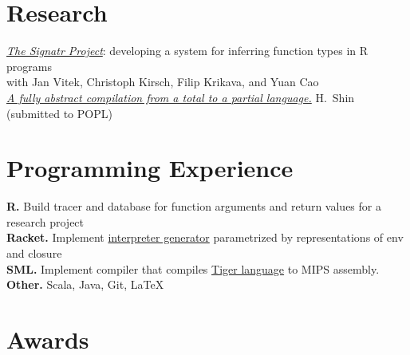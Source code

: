 \documentclass[margin,line]{resume}
\begin{document}
\begin{resume}
    \renewcommand\mymedskip{3pt}
    \section{\mysidestyle Research}
    \textit{\href{https://github.com/PRL-PRG/signatr}{The Signatr Project}}:
    developing a system for inferring function types in R programs\\
          {\small with Jan Vitek, Christoph Kirsch, Filip Krikava, and Yuan Cao}\\[\mymedskip]
    \textit{\href{https://github.com/hyeyoungshin/popl19src/blob/master/popl19src.pdf}{A fully abstract compilation from
        a total to a partial language.}} H.~Shin (submitted to {\small POPL})

    \section{\mysidestyle Programming Experience} 

    \textbf{R.} Build tracer and database for function arguments and return values for a research project\\[\mymedskip]
    \textbf{Racket.} Implement \href{https://github.com/hyeyoungshin/hy_eopl}{interpreter generator} parametrized by representations of env and closure\\[\mymedskip]
    \textbf{SML.} Implement compiler that compiles
    \href{https://www.cs.princeton.edu/~appel/modern/ml/}{Tiger language} to
    {\small MIPS} assembly.\\[\mymedskip]
    \textbf{Other.} Scala, Java, Git, \LaTeX 



    \section{\mysidestyle Awards} 


\end{resume}
\end{document}
